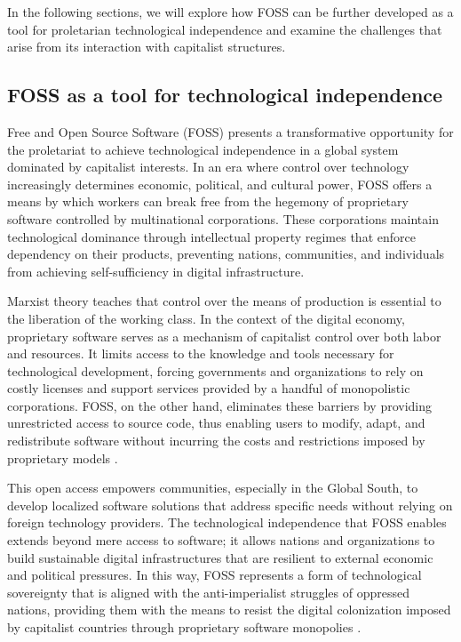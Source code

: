 \begin{refsection}
In the following sections, we will explore how FOSS can be further developed as a tool for proletarian technological independence and examine the challenges that arise from its interaction with capitalist structures.

\subsection{FOSS as a tool for technological independence}

Free and Open Source Software (FOSS) presents a transformative opportunity for the proletariat to achieve technological independence in a global system dominated by capitalist interests. In an era where control over technology increasingly determines economic, political, and cultural power, FOSS offers a means by which workers can break free from the hegemony of proprietary software controlled by multinational corporations. These corporations maintain technological dominance through intellectual property regimes that enforce dependency on their products, preventing nations, communities, and individuals from achieving self-sufficiency in digital infrastructure.

Marxist theory teaches that control over the means of production is essential to the liberation of the working class. In the context of the digital economy, proprietary software serves as a mechanism of capitalist control over both labor and resources. It limits access to the knowledge and tools necessary for technological development, forcing governments and organizations to rely on costly licenses and support services provided by a handful of monopolistic corporations. FOSS, on the other hand, eliminates these barriers by providing unrestricted access to source code, thus enabling users to modify, adapt, and redistribute software without incurring the costs and restrictions imposed by proprietary models \cite[pp.~111-112]{stallman2010}.

This open access empowers communities, especially in the Global South, to develop localized software solutions that address specific needs without relying on foreign technology providers. The technological independence that FOSS enables extends beyond mere access to software; it allows nations and organizations to build sustainable digital infrastructures that are resilient to external economic and political pressures. In this way, FOSS represents a form of technological sovereignty that is aligned with the anti-imperialist struggles of oppressed nations, providing them with the means to resist the digital colonization imposed by capitalist countries through proprietary software monopolies \cite[pp.~58-60]{moody2020}.


\end{refsection}
